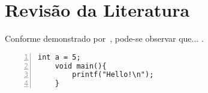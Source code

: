 \chapter{Revisão da Literatura}

Conforme demonstrado por~\cite{Chiu2019}, pode-se observar que...
\cite{LeCun1990}.
\lstset{language=C}
\begin{lstlisting}[frame=single, numbers=left]
	int a = 5;
	void main(){
		printf("Hello!\n");
	}
\end{lstlisting}
\lstset{language=Python}

